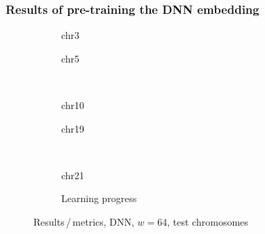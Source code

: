 \subsubsection{Results of pre-training the DNN embedding} \label{sec:appendix:pretraining_results}
\begin{figure}[h!] %
    \begin{subfigure}{0.45\textwidth}
        \scriptsize
        \caption{chr3}
    \end{subfigure} \hfill
    \begin{subfigure}{0.45\textwidth}
        \scriptsize
        \caption{chr5}
    \end{subfigure}\\[5mm]
    \begin{subfigure}{0.45\textwidth}
        \scriptsize
        \caption{chr10}
    \end{subfigure}\hfill
    \begin{subfigure}{0.45\textwidth}
        \scriptsize
        \caption{chr19}
    \end{subfigure}\\[3mm]
    \centering
    \begin{subfigure}{0.45\textwidth}
        \scriptsize
        \caption{chr21}
    \end{subfigure} \hfill
    \begin{subfigure}{0.45\textwidth}
        \scriptsize
        \caption{Learning progress} \label{fig:results:DNN64_lossEpochs}
    \end{subfigure}
    \caption{Results\,/\,metrics, DNN, $w=64$, test chromosomes}   \label{fig:results:DNN64_pearson}
\end{figure}
